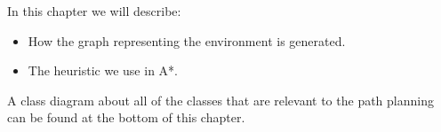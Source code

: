 In this chapter we will describe: 

\begin{itemize}
	\item How the graph representing the environment is generated.
	\item The heuristic we use in A*.
\end{itemize}

A class diagram about all of the classes that are relevant to the path planning can be found at the bottom of this chapter.